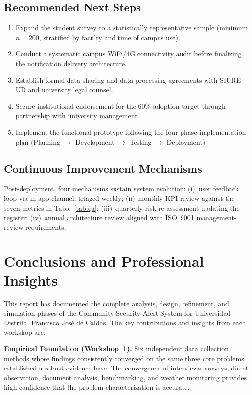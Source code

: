 \documentclass[11pt,a4paper]{article}
\begin{document}
\subsection{Recommended Next Steps}

\begin{enumerate}
\item Expand the student survey to a statistically representative sample (minimum $n = 200$, stratified by faculty and time of campus use).
\item Conduct a systematic campus WiFi/4G connectivity audit before finalizing the notification delivery architecture.
\item Establish formal data-sharing and data processing agreements with SIURE UD and university legal counsel.
\item Secure institutional endorsement for the 60\% adoption target through partnership with university management.
\item Implement the functional prototype following the four-phase implementation plan (Planning $\to$ Development $\to$ Testing $\to$ Deployment).
\end{enumerate}

\subsection{Continuous Improvement Mechanisms}

Post-deployment, four mechanisms sustain system evolution: (i)~user feedback loop via in-app channel, triaged weekly; (ii)~monthly KPI review against the seven metrics in Table~\ref{tab:qa}; (iii)~quarterly risk re-assessment updating the register; (iv)~annual architecture review aligned with ISO~9001 management-review requirements.


\section{Conclusions and Professional Insights}

This report has documented the complete analysis, design, refinement, and simulation phases of the Community Security Alert System for Universidad Distrital Francisco Jos\'e de Caldas. The key contributions and insights from each workshop are:

\textbf{Empirical Foundation (Workshop~1).} Six independent data collection methods whose findings consistently converged on the same three core problems established a robust evidence base. The convergence of interviews, surveys, direct observation, document analysis, benchmarking, and weather monitoring provides high confidence that the problem characterization is accurate.
\end{document}
